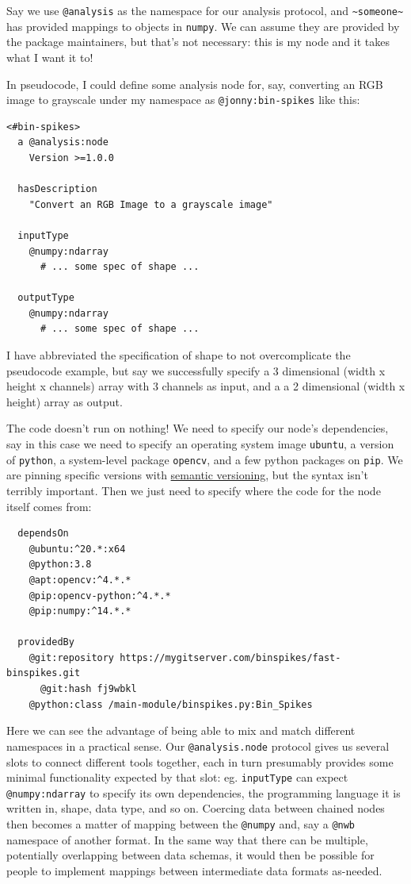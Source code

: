 \documentclass[notoc]{tufte-book}
\begin{document}
Say we use \texttt{@analysis} as the namespace for our analysis
protocol, and \texttt{\textasciitilde{}someone\textasciitilde{}} has
provided mappings to objects in \texttt{numpy}. We can assume they are
provided by the package maintainers, but that's not necessary: this is
my node and it takes what I want it to!

In pseudocode, I could define some analysis node for, say, converting an
RGB image to grayscale under my namespace as \texttt{@jonny:bin-spikes}
like this:

\begin{verbatim}
<#bin-spikes>
  a @analysis:node
    Version >=1.0.0

  hasDescription
    "Convert an RGB Image to a grayscale image"

  inputType
    @numpy:ndarray
      # ... some spec of shape ...

  outputType
    @numpy:ndarray
      # ... some spec of shape ...
\end{verbatim}

I have abbreviated the specification of shape to not overcomplicate the
pseudocode example, but say we successfully specify a 3 dimensional
(width x height x channels) array with 3 channels as input, and a a 2
dimensional (width x height) array as output.

The code doesn't run on nothing! We need to specify our node's
dependencies, say in this case we need to specify an operating system
image \texttt{ubuntu}, a version of \texttt{python}, a system-level
package \texttt{opencv}, and a few python packages on \texttt{pip}. We
are pinning specific versions with \href{https://semver.org/}{semantic
versioning}, but the syntax isn't terribly important. Then we just need
to specify where the code for the node itself comes from:

\begin{verbatim}
  dependsOn
    @ubuntu:^20.*:x64
    @python:3.8
    @apt:opencv:^4.*.*
    @pip:opencv-python:^4.*.*
    @pip:numpy:^14.*.*

  providedBy
    @git:repository https://mygitserver.com/binspikes/fast-binspikes.git
      @git:hash fj9wbkl
    @python:class /main-module/binspikes.py:Bin_Spikes
\end{verbatim}

Here we can see the advantage of being able to mix and match different
namespaces in a practical sense. Our \texttt{@analysis.node} protocol
gives us several slots to connect different tools together, each in turn
presumably provides some minimal functionality expected by that slot:
eg. \texttt{inputType} can expect \texttt{@numpy:ndarray} to specify its
own dependencies, the programming language it is written in, shape, data
type, and so on. Coercing data between chained nodes then becomes a
matter of mapping between the \texttt{@numpy} and, say a \texttt{@nwb}
namespace of another format. In the same way that there can be multiple,
potentially overlapping between data schemas, it would then be possible
for people to implement mappings between intermediate data formats
as-needed.
\end{document}
